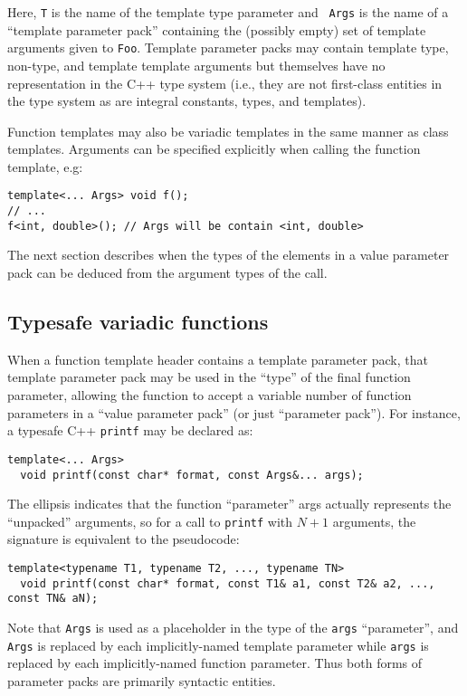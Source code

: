 \documentclass{article}
\begin{document}
\noindent
Here, {\tt T} is the name of the template type parameter and {\tt
  Args} is the name of a ``template parameter pack'' containing the
(possibly empty) set of template arguments given to {\tt Foo}.
Template parameter packs may contain template type, non-type, and
template template arguments but themselves have no representation in
the C++ type system (i.e., they are not first-class entities in the
type system as are integral constants, types, and templates).

Function templates may also be variadic templates in the same manner
as class templates.  Arguments can be specified explicitly when
calling the function template, e.g:

\begin{verbatim}
template<... Args> void f();
// ... 
f<int, double>(); // Args will be contain <int, double>
\end{verbatim}
The next section describes when the types of the elements in 
a value parameter pack can be deduced from the argument types
of the call. 

\subsection{Typesafe variadic functions}
When a function template header contains a template parameter pack,
that template parameter pack may be used in the ``type'' of the final
function parameter, allowing the function to accept a variable number
of function parameters in a ``value parameter pack'' (or just
``parameter pack''). For instance, a typesafe C++ {\tt printf} may
be declared as:
\begin{verbatim}
template<... Args>
  void printf(const char* format, const Args&... args);
\end{verbatim}

\noindent The ellipsis indicates that the function ``parameter'' args
actually represents the ``unpacked'' arguments, so for a call to
\texttt{printf} with $N+1$ arguments, the signature is equivalent to
the pseudocode:

\begin{verbatim}
template<typename T1, typename T2, ..., typename TN>
  void printf(const char* format, const T1& a1, const T2& a2, ..., const TN& aN);
\end{verbatim}

\noindent 
Note that \texttt{Args} is used as a placeholder in the type of the
\texttt{args} ``parameter'', and \texttt{Args} is replaced by each
implicitly-named template parameter while \texttt{args} is replaced by
each implicitly-named function parameter. Thus both forms of parameter
packs are primarily syntactic entities.
\end{document}
